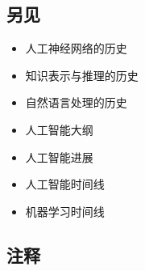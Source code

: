 \subsection{另见}  
\begin{itemize}
\item 人工神经网络的历史  
\item 知识表示与推理的历史  
\item 自然语言处理的历史  
\item 人工智能大纲  
\item 人工智能进展  
\item 人工智能时间线  
\item 机器学习时间线
\end{itemize}
\subsection{注释} 
